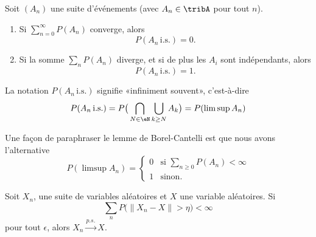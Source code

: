 \begin{lemma}
	Soit \( (A_n)\) une suite d'événements (avec \( A_n\in\tribA\) pour tout \( n\)).
	\begin{enumerate}
		\item
		      Si \( \sum_{n=0}^{\infty}P(A_n)\) converge, alors
		      \begin{equation}
			      P(A_n\,\text{i.s.})=0.
		      \end{equation}
		\item
		      Si la somme \( \sum_nP(A_n)\) diverge, et si de plus les \( A_i\) sont indépendants, alors
		      \begin{equation}
			      P(A_n\,\text{i.s.})=1.
		      \end{equation}
	\end{enumerate}
\end{lemma}
La notation \( P(A_n\,\text{i.s.})\) signifie «infiniment souvent», c'est-à-dire
\begin{equation}
	P(A_n\,\text{i.s.})=P\big( \bigcap_{N\in\eN}\bigcup_{k\geq N}A_k \big)=P(\limsup A_n)
\end{equation}

Une façon de paraphraser le lemme de Borel-Cantelli est que nous avons l'alternative
\begin{equation}    \label{EqparaphrCantelli}
	P(\limsup A_n)=\begin{cases}
		0 & \text{si }\sum_{n\geq 0}P(A_n)<\infty \\
		1 & \text{sinon}.
	\end{cases}
\end{equation}

\begin{proposition}
	Soit \( X_n\), une suite de variables aléatoires et \( X\) une variable aléatoires. Si
	\begin{equation}
		\sum_nP\big( \| X_n-X \|>\eta \big)<\infty
	\end{equation}
	pour tout \( \epsilon\), alors \( X_n\stackrel{p.s.}{\longrightarrow}X\).
\end{proposition}

